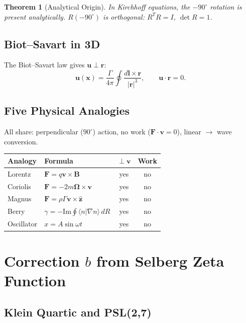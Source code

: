 \documentclass[11pt,a4paper]{article}
\newtheorem{theorem}{Theorem}[section]
\begin{document}
\begin{theorem}[Analytical Origin]
In Kirchhoff equations, the $-90^\circ$ rotation is present analytically. $R(-90^\circ)$ is orthogonal: $R^T R = I$, $\det R = 1$.
\end{theorem}

\subsection{Biot--Savart in 3D}

The Biot--Savart law gives $\mathbf{u} \perp \mathbf{r}$:
\begin{equation}
\mathbf{u}(\mathbf{x}) = \frac{\Gamma}{4\pi}\oint\frac{d\mathbf{l}\times\mathbf{r}}{|\mathbf{r}|^3}, \qquad \mathbf{u}\cdot\mathbf{r} = 0.
\end{equation}

\subsection{Five Physical Analogies}

All share: perpendicular ($90^\circ$) action, no work ($\mathbf{F}\cdot\mathbf{v} = 0$), linear $\to$ wave conversion.

\begin{center}
\begin{tabular}{llcc}
\toprule
Analogy & Formula & $\perp\mathbf{v}$ & Work \\
\midrule
Lorentz & $\mathbf{F} = q\mathbf{v}\times\mathbf{B}$ & yes & no \\
Coriolis & $\mathbf{F} = -2m\boldsymbol{\Omega}\times\mathbf{v}$ & yes & no \\
Magnus & $\mathbf{F} = \rho\Gamma\mathbf{v}\times\hat{\mathbf{z}}$ & yes & no \\
Berry & $\gamma = -\mathrm{Im}\oint\langle n|\nabla n\rangle\,dR$ & yes & no \\
Oscillator & $x=A\sin\omega t$ & yes & no \\
\bottomrule
\end{tabular}
\end{center}

\section{Correction $b$ from Selberg Zeta Function}

\subsection{Klein Quartic and PSL(2,7)}
\end{document}
